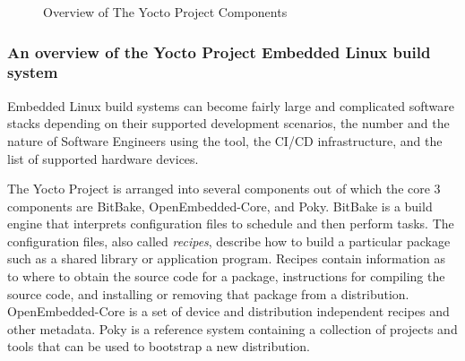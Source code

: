 \begin{figure}[h]
	\caption{Overview of The Yocto Project Components}
	\label{fig:yocto-overview}
\end{figure}

\subsubsection{An overview of the Yocto Project Embedded Linux build system}

Embedded Linux build systems can become fairly large and complicated software stacks depending on their supported development scenarios, the number and the nature of Software Engineers using the tool, the CI/CD infrastructure, and the list of supported hardware devices.

The Yocto Project is arranged into several components out of which the core 3 components are BitBake, OpenEmbedded-Core, and Poky. BitBake is a build engine that interprets configuration files to schedule and then perform tasks. The configuration files, also called  \textit{recipes}, describe how to build a particular package such as a shared library or application program. Recipes contain information as to where to obtain the source code for a package, instructions for compiling the source code, and installing or removing that package from a distribution. OpenEmbedded-Core is a set of device and distribution independent recipes and other metadata. Poky is a reference system containing a collection of projects and tools that can be used to bootstrap a new distribution.

